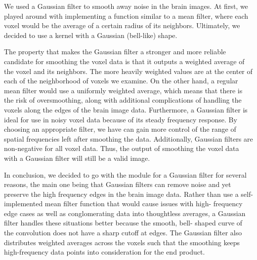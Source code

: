 
\par \indent We used a Gaussian filter to smooth away noise in the brain 
images. At first, we played around with implementing a function similar 
to a mean filter, where each voxel would be the average of a certain radius 
of its neighbors. Ultimately, we decided to use a kernel with a Gaussian 
(bell-like) shape. 

\par The property that makes the Gaussian filter a stronger and more 
reliable candidate for smoothing the voxel data is that it outputs a weighted 
average of the voxel and its neighbors. The more heavily weighted values are 
at the center of each of the neighborhood of voxels we examine. On the other 
hand, a regular mean filter would use a uniformly weighted average, which 
means that there is the risk of oversmoothing, along with additional 
complications of handling the voxels along the edges of the brain image data. 
Furthermore, a Gaussian filter is ideal for use in noisy voxel data because of 
its steady frequency response. By choosing an appropriate filter, we have can 
gain more control of the range of spatial frequencies left after smoothing 
the data. Additionally, Gaussian filters are non-negative for all voxel data. 
Thus, the output of smoothing the voxel data with a Gaussian filter will still 
be a valid image. 

\par In conclusion, we decided to go with the module for a Gaussian filter for 
several reasons, the main one being that Gaussian filters can remove noise and 
yet preserve the high frequency edges in the brain image data. Rather than use 
a self-implemented mean filter function that would cause issues with high-
frequency edge cases as well as conglomerating data into thoughtless averages, 
a Gaussian filter handles these situations better because the smooth, bell-
shaped curve of the convolution does not have a sharp cutoff at edges. The 
Gaussian filter also distributes weighted averages across the voxels such that 
the smoothing keeps high-frequency data points into consideration for the end 
product.
